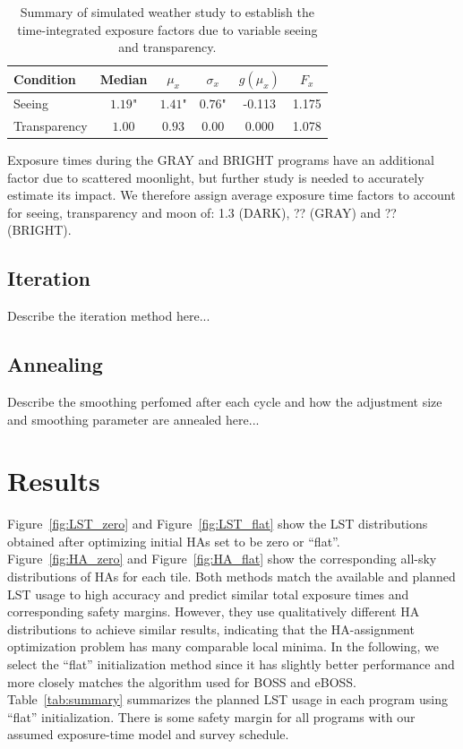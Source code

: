 \documentclass[12pt]{article}
\providecommand{\tab}[1]{Table~\ref{tab:#1}}
\providecommand{\fig}[1]{Figure~\ref{fig:#1}}
\begin{document}
\begin{table}[htb]
\begin{center}
\begin{tabular}{lccccc}
Condition & Median & $\mu_x$ & $\sigma_x$ & $g(\mu_x)$ & $F_x$ \\
\hline
Seeing & $1.19$" & $1.41$" & $0.76$" & -0.113 & 1.175 \\
Transparency & $1.00$ & $0.93$ & $0.00$ & 0.000 & 1.078 \\
\hline
\end{tabular}
\caption{Summary of simulated weather study to establish the time-integrated exposure factors due to variable seeing and transparency.}
\label{tab:expfac}
\end{center}
\end{table}

Exposure times during the GRAY and BRIGHT programs have an additional factor due to scattered moonlight, but further study is needed to accurately estimate its impact.  We therefore assign average exposure time factors to account for seeing, transparency and moon of: 1.3 (DARK), ?? (GRAY) and ?? (BRIGHT).

\subsection{Iteration}

Describe the iteration method here...

\subsection{Annealing}

Describe the smoothing perfomed after each cycle and how the adjustment size and smoothing parameter are annealed here...

\section{Results}

\fig{LST_zero} and \fig{LST_flat} show the LST distributions obtained after optimizing initial HAs set to be zero or ``flat''.  \fig{HA_zero} and \fig{HA_flat} show the corresponding all-sky distributions of HAs for each tile.  Both methods match the available and planned LST usage to high accuracy and predict similar total exposure times and corresponding safety margins. However, they use qualitatively different HA distributions to achieve similar results, indicating that the HA-assignment optimization problem has many comparable local minima.  In the following, we select the ``flat'' initialization method since it has slightly better performance and more closely matches the algorithm used for BOSS and eBOSS.  \tab{summary} summarizes the planned LST usage in each program using ``flat'' initialization.  There is some safety margin for all programs with our assumed exposure-time model and survey schedule.
\end{document}
